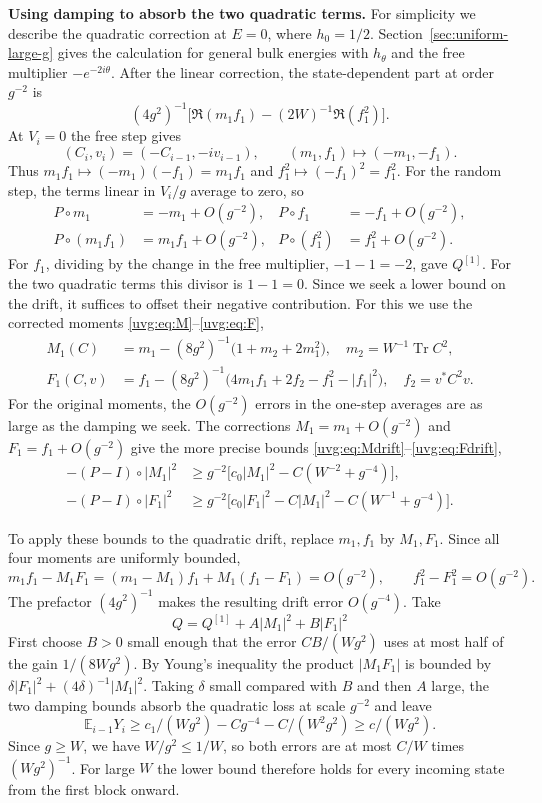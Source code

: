 \documentclass[11pt]{article}
\numberwithin{equation}{section}
\theoremstyle{remark}
\newcommand{\E}{\mathbb E}
\newcommand{\Tr}{\operatorname{Tr}}
\begin{document}
\medskip\noindent\textbf{Using damping to absorb the two quadratic terms.}
For simplicity we describe the quadratic correction at $E=0$, where
$h_0=1/2$. Section~\ref{sec:uniform-large-g} gives the calculation
for general bulk energies with $h_\theta$ and the free multiplier
$-e^{-2i\theta}$. After the linear correction, the state-dependent part at order
$g^{-2}$ is
\[
 (4g^2)^{-1}\bigl[\Re(m_1f_1)-(2W)^{-1}\Re(f_1^2)\bigr].
\]
At $V_i=0$ the free step gives
\[
 (C_i,v_i)=(-C_{i-1},-iv_{i-1}),\qquad (m_1,f_1)\longmapsto(-m_1,-f_1).
\]
Thus $m_1f_1\mapsto(-m_1)(-f_1)=m_1f_1$ and
$f_1^2\mapsto(-f_1)^2=f_1^2$. For the random step, the terms linear
in $V_i/g$ average to zero, so
\[
 \begin{aligned}
 P\circ m_1&=-m_1+O(g^{-2}),&
 P\circ f_1&=-f_1+O(g^{-2}),\\
 P\circ(m_1f_1)&=m_1f_1+O(g^{-2}),&
 P\circ(f_1^2)&=f_1^2+O(g^{-2}).
 \end{aligned}
\]
For $f_1$, dividing by the change in the free multiplier, $-1-1=-2$,
gave $Q^{[1]}$. For the two quadratic terms this divisor is $1-1=0$.
Since we seek a lower bound on the drift, it suffices to offset their
negative contribution. For this we use the corrected moments
\eqref{uvg:eq:M}--\eqref{uvg:eq:F},
\[
 \begin{aligned}
 M_1(C)&=m_1-(8g^2)^{-1}\bigl(1+m_2+2m_1^2\bigr),\quad m_2=W^{-1}\Tr C^2,\\
 F_1(C,v)&=f_1-(8g^2)^{-1}\bigl(4m_1f_1+2f_2-f_1^2-|f_1|^2\bigr),\quad f_2=v^*C^2v.
 \end{aligned}
\]
For the original moments, the $O(g^{-2})$ errors in the one-step
averages are as large as the damping we seek. The corrections
$M_1=m_1+O(g^{-2})$ and $F_1=f_1+O(g^{-2})$ give the more precise
bounds \eqref{uvg:eq:Mdrift}--\eqref{uvg:eq:Fdrift},
\[
 \begin{aligned}
 -(P-I)\circ |M_1|^2
 &\ge g^{-2}\bigl[c_0|M_1|^2-C(W^{-2}+g^{-4})\bigr],\\
 -(P-I)\circ |F_1|^2
 &\ge g^{-2}\bigl[c_0|F_1|^2-C|M_1|^2-C(W^{-1}+g^{-4})\bigr].
 \end{aligned}
\]

To apply these bounds to the quadratic drift, replace $m_1,f_1$ by
$M_1,F_1$. Since all four moments are uniformly bounded,
\[
 m_1f_1-M_1F_1=(m_1-M_1)f_1+M_1(f_1-F_1)=O(g^{-2}),\qquad
 f_1^2-F_1^2=O(g^{-2}).
\]
The prefactor $(4g^2)^{-1}$ makes the resulting drift error $O(g^{-4})$.
Take $$Q=Q^{[1]}+A|M_1|^2+B|F_1|^2$$ First choose $B>0$ small enough
that the error $CB/(Wg^2)$ uses at most half of the gain $1/(8Wg^2)$.
By Young's inequality the product $|M_1F_1|$ is bounded by
$\delta |F_1|^2+(4\delta)^{-1}|M_1|^2$. Taking $\delta$ small compared
with $B$ and then $A$ large, the two damping bounds absorb the
quadratic loss at scale $g^{-2}$ and leave
\[
 \E_{i-1}Y_i
 \ge c_1/(Wg^2)-Cg^{-4}-C/(W^2g^2)
 \ge c/(Wg^2).
\]
Since $g\ge W$, we have $W/g^2\le 1/W$, so both errors are at most
$C/W$ times $(Wg^2)^{-1}$. For large $W$ the lower bound therefore
holds for every incoming state from the first block onward.
\end{document}
